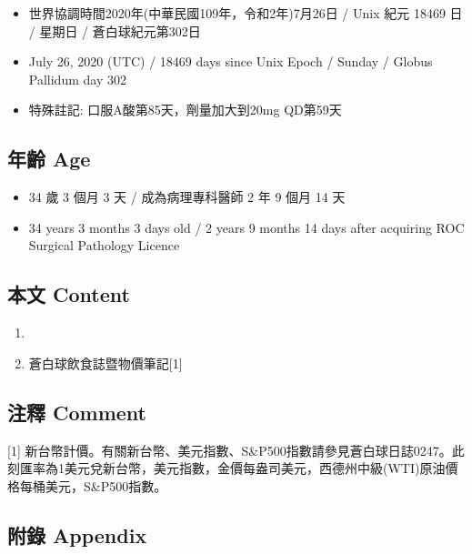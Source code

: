 \documentclass[
]{article}
\providecommand{\tightlist}{%
  \setlength{\itemsep}{0pt}\setlength{\parskip}{0pt}}
\begin{document}
\begin{itemize}
\tightlist
\item
  世界協調時間2020年(中華民國109年，令和2年)7月26日 / Unix 紀元 18469 日
  / 星期日 / 蒼白球紀元第302日
\item
  July 26, 2020 (UTC) / 18469 days since Unix Epoch / Sunday / Globus
  Pallidum day 302
\item
  特殊註記: 口服A酸第85天，劑量加大到20mg QD第59天
\end{itemize}

\hypertarget{ux5e74ux9f61-age-25}{%
\subsection{年齡 Age}\label{ux5e74ux9f61-age-25}}

\begin{itemize}
\tightlist
\item
  34 歲 3 個月 3 天 / 成為病理專科醫師 2 年 9 個月 14 天
\item
  34 years 3 months 3 days old / 2 years 9 months 14 days after
  acquiring ROC Surgical Pathology Licence
\end{itemize}

\hypertarget{ux672cux6587-content-25}{%
\subsection{本文 Content}\label{ux672cux6587-content-25}}

\begin{enumerate}
\def\labelenumi{\arabic{enumi}.}
\tightlist
\item
\item
  蒼白球飲食誌暨物價筆記{[}1{]}
\end{enumerate}

\hypertarget{ux6ce8ux91cb-comment-25}{%
\subsection{注釋 Comment}\label{ux6ce8ux91cb-comment-25}}

{[}1{]}
新台幣計價。有關新台幣、美元指數、S\&P500指數請參見蒼白球日誌0247。此刻匯率為1美元兌新台幣，美元指數，金價每盎司美元，西德州中級(WTI)原油價格每桶美元，S\&P500指數。

\hypertarget{ux9644ux9304-appendix-25}{%
\subsection{附錄 Appendix}\label{ux9644ux9304-appendix-25}}
\end{document}
